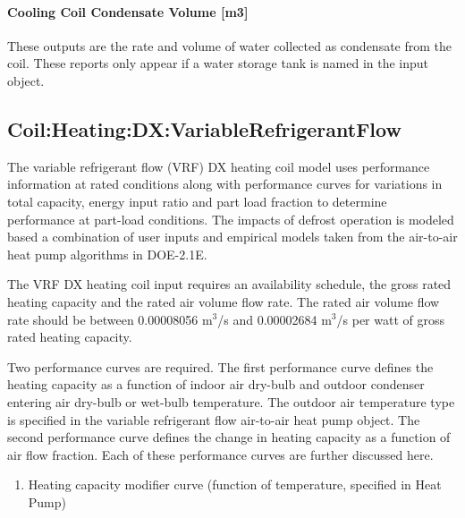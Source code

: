 \paragraph{Cooling Coil Condensate Volume {[}m3{]}}\label{cooling-coil-condensate-volume-m3-1}

These outputs are the rate and volume of water collected as condensate from the coil. These reports only appear if a water storage tank is named in the input object.

\subsection{Coil:Heating:DX:VariableRefrigerantFlow}\label{coilheatingdxvariablerefrigerantflow}

The variable refrigerant flow (VRF) DX heating coil model uses performance information at rated conditions along with performance curves for variations in total capacity, energy input ratio and part load fraction to determine performance at part-load conditions. The impacts of defrost operation is modeled based a combination of user inputs and empirical models taken from the air-to-air heat pump algorithms in DOE-2.1E.

The VRF DX heating coil input requires an availability schedule, the gross rated heating capacity and the rated air volume flow rate. The rated air volume flow rate should be between 0.00008056 m\(^{3}\)/s and 0.00002684 m\(^{3}\)/s per watt of gross rated heating capacity.

Two performance curves are required. The first performance curve defines the heating capacity as a function of indoor air dry-bulb and outdoor condenser entering air dry-bulb or wet-bulb temperature. The outdoor air temperature type is specified in the variable refrigerant flow air-to-air heat pump object. The second performance curve defines the change in heating capacity as a function of air flow fraction. Each of these performance curves are further discussed here.

\begin{enumerate}
\def\labelenumi{\arabic{enumi})}
\tightlist
\item
  Heating capacity modifier curve (function of temperature, specified in Heat Pump)
\end{enumerate}


